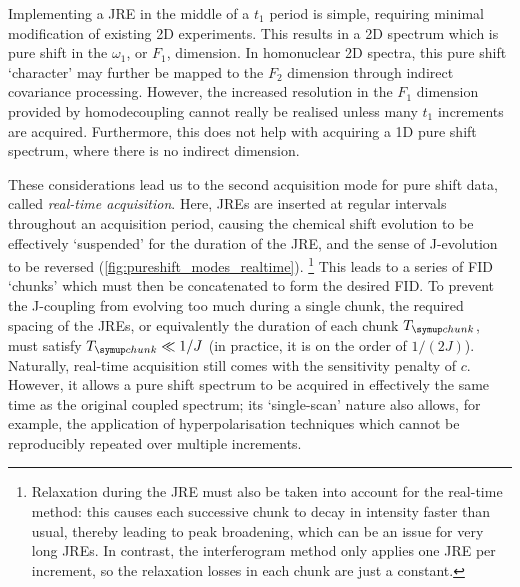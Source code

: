 Implementing a JRE in the middle of a $t_1$ period is simple, requiring minimal modification of existing 2D experiments.
This results in a 2D spectrum which is pure shift in the $\omega_1$, or $F_1$, dimension.
In homonuclear 2D spectra, this pure shift `character' may further be mapped to the $F_2$ dimension through indirect covariance processing\autocite{Bruschweiler2004JCP,Zhang2004JACS,Jaeger2014ARNMRS,Morris2010JACS,Aguilar2012ACIE,Foroozandeh2014JACS}.
However, the increased resolution in the $F_1$ dimension provided by homodecoupling cannot really be realised unless many $t_1$ increments are acquired.
Furthermore, this does not help with acquiring a 1D pure shift spectrum, where there is no indirect dimension.

These considerations lead us to the second acquisition mode for pure shift data, called \textit{real-time acquisition}\autocite{Lupulescu2012JMR,Meyer2013ACIE,Mauhart2015JMR,Kiraly2018MRC}.
Here, JREs are inserted at regular intervals throughout an acquisition period, causing the chemical shift evolution to be effectively `suspended' for the duration of the JRE, and the sense of J-evolution to be reversed (\cref{fig:pureshift_modes_realtime}).%
\footnote{Relaxation during the JRE must also be taken into account for the real-time method: this causes each successive chunk to decay in intensity faster than usual, thereby leading to peak broadening, which can be an issue for very long JREs.
In contrast, the interferogram method only applies one JRE per increment, so the relaxation losses in each chunk are just a constant.}
This leads to a series of FID `chunks' which must then be concatenated to form the desired FID.
To prevent the J-coupling from evolving too much during a single chunk, the required spacing of the JREs, or equivalently the duration of each chunk $\Tchunk$, must satisfy $\Tchunk \ll 1/J\/$ (in practice, it is on the order of $1/(2J)$).
Naturally, real-time acquisition still comes with the sensitivity penalty of $c$.
However, it allows a pure shift spectrum to be acquired in effectively the same time as the original coupled spectrum; its `single-scan' nature also allows, for example, the application of hyperpolarisation techniques which cannot be reproducibly repeated over multiple increments.\autocite{Donovan2014ACIE,Taylor2021MRC}

